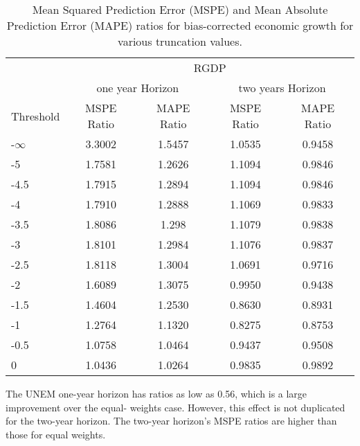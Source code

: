 \documentclass[11pt]{article}
\begin{document}
	\begin{table}[!h]
		\centering
		\caption{Mean Squared Prediction Error (MSPE) and Mean Absolute Prediction Error (MAPE) ratios for bias-corrected economic growth for various truncation values.}
		\label{tab: MSPE RGDP bias}
		\begin{tabular}{lcccc}
			\hline
			&                        \multicolumn{4}{c}{RGDP}                         \\
			\cmidrule(lr){2-5}                              & \multicolumn{2}{c}{one year Horizon} & \multicolumn{2}{c}{two years Horizon} \\
			\cmidrule(lr){2-3} \cmidrule(lr){4-5}
			Threshold & MSPE Ratio & MAPE Ratio  & MSPE Ratio & MAPE Ratio  \\ \hline
			-$\infty$ & 3.3002 & 1.5457 & 1.0535 & 0.9458\\ 
			-5 & 1.7581 & 1.2626 & 1.1094 & 0.9846\\ 
			-4.5 & 1.7915 & 1.2894 & 1.1094 & 0.9846\\ 
			-4 & 1.7910 & 1.2888 & 1.1069 & 0.9833\\ 
			-3.5 & 1.8086 & 1.298 & 1.1079 & 0.9838\\ 
			-3 & 1.8101 & 1.2984 & 1.1076 & 0.9837\\ 
			-2.5 & 1.8118 & 1.3004 & 1.0691 & 0.9716\\ 
			-2 & 1.6089 & 1.3075 & 0.9950 & 0.9438\\ 
			-1.5 & 1.4604 & 1.2530 & 0.8630 & 0.8931\\ 
			-1 & 1.2764 & 1.1320 & 0.8275 & 0.8753\\ 
			-0.5 & 1.0758 & 1.0464 & 0.9437 & 0.9508\\ 
			0 & 1.0436 & 1.0264 & 0.9835 & 0.9892\\ \hline
		\end{tabular}
	\end{table}
	
	
	The UNEM one-year horizon has ratios as low as 0.56, which is a large improvement over the equal- weights case. However, this effect is not duplicated for the two-year horizon. The two-year horizon's MSPE ratios are higher than those for equal weights.
	
\end{document}

